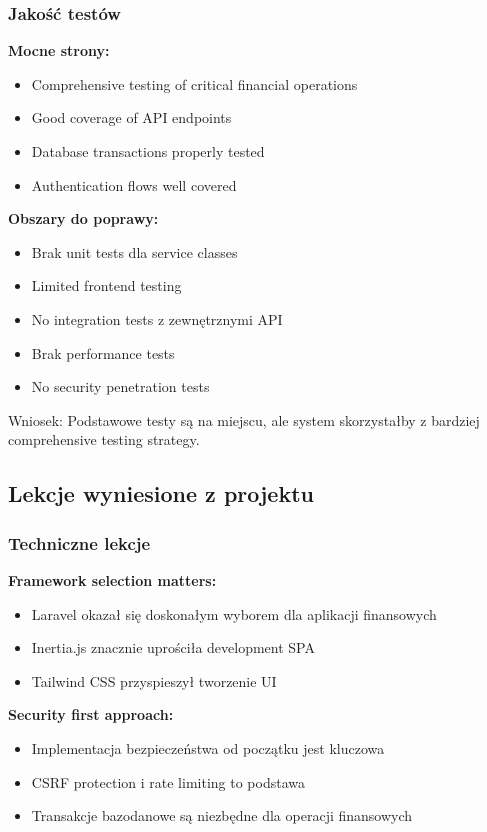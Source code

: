 \documentclass[12pt,a4paper]{article}
\begin{document}
    \subsubsection{Jakość testów}

    \textbf{Mocne strony:}
    \begin{itemize}
        \item Comprehensive testing of critical financial operations
        \item Good coverage of API endpoints
        \item Database transactions properly tested
        \item Authentication flows well covered
    \end{itemize}

    \textbf{Obszary do poprawy:}
    \begin{itemize}
        \item Brak unit tests dla service classes
        \item Limited frontend testing
        \item No integration tests z zewnętrznymi API
        \item Brak performance tests
        \item No security penetration tests
    \end{itemize}

    Wniosek: Podstawowe testy są na miejscu, ale system skorzystałby z bardziej comprehensive testing strategy.

    \subsection{Lekcje wyniesione z projektu}

    \subsubsection{Techniczne lekcje}

    \textbf{Framework selection matters:}
    \begin{itemize}
        \item Laravel okazał się doskonałym wyborem dla aplikacji finansowych
        \item Inertia.js znacznie uprościła development SPA
        \item Tailwind CSS przyspieszył tworzenie UI
    \end{itemize}

    \textbf{Security first approach:}
    \begin{itemize}
        \item Implementacja bezpieczeństwa od początku jest kluczowa
        \item CSRF protection i rate limiting to podstawa
        \item Transakcje bazodanowe są niezbędne dla operacji finansowych
    \end{itemize}
\end{document}
